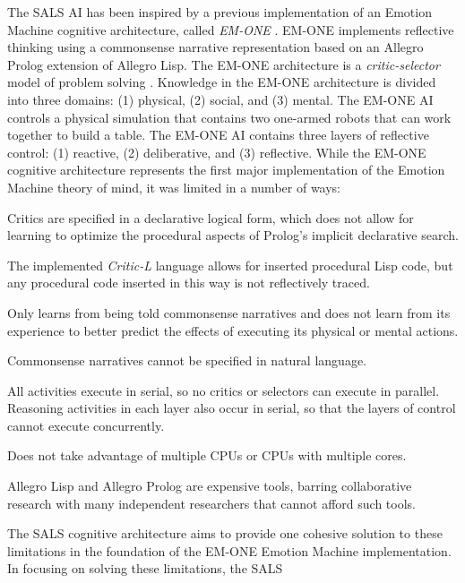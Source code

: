 The SALS AI has been inspired by a previous implementation of an
Emotion Machine cognitive architecture, called {\emph{EM-ONE}}
\cite[]{singh:2005b}.  EM-ONE implements reflective thinking using a
commonsense narrative representation based on an Allegro Prolog
extension of Allegro Lisp.  The EM-ONE architecture is a
{\emph{critic-selector}} model of problem solving
\cite[]{sussman:1973,singh:2002a,singh:2004,singh:2005a,singh:2005b,minsky:2006,morgan:2009}.
Knowledge in the EM-ONE architecture is divided into three domains:
(1) physical, (2) social, and (3) mental.  The EM-ONE AI controls a
physical simulation that contains two one-armed robots that can work
together to build a table.  The EM-ONE AI contains three layers of
reflective control: (1) reactive, (2) deliberative, and (3)
reflective.  While the EM-ONE cognitive architecture represents the
first major implementation of the Emotion Machine theory of mind, it
was limited in a number of ways:
\begin{packed_enumerate}
\item{Critics are specified in a declarative logical form, which does
  not allow for learning to optimize the procedural aspects of
  Prolog's implicit declarative search.}
\item{The implemented {\emph{Critic-L}} language allows for inserted
  procedural Lisp code, but any procedural code inserted in this way
  is not reflectively traced.}
\item{Only learns from being told commonsense narratives and does not
  learn from its experience to better predict the effects of executing
  its physical or mental actions.}
\item{Commonsense narratives cannot be specified in natural language.}
\item{All activities execute in serial, so no critics or selectors can
  execute in parallel.  Reasoning activities in each layer also occur
  in serial, so that the layers of control cannot execute
  concurrently.}
\item{Does not take advantage of multiple CPUs or CPUs with multiple
  cores.}
\item{Allegro Lisp and Allegro Prolog are expensive tools, barring
  collaborative research with many independent researchers that cannot
  afford such tools.}
\end{packed_enumerate}
The SALS cognitive architecture aims to provide one cohesive solution
to these limitations in the foundation of the EM-ONE Emotion Machine
implementation.  In focusing on solving these limitations, the SALS
